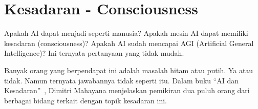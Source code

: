 \chapter{Kesadaran - Consciousness}
Apakah AI dapat menjadi seperti manusia?
Apakah mesin AI dapat memiliki kesadaran (consciousness)?
Apakah AI sudah mencapai AGI (Artificial General Intelligence)?
Ini ternyata pertanyaan yang tidak mudah.

Banyak orang yang berpendapat ini adalah masalah hitam atau putih.
Ya atau tidak.
Namun ternyata jawabannya tidak seperti itu.
Dalam buku ``AI dan Kesadaran''~\cite{dimitrikesadaran}, 
Dimitri Mahayana menjelaskan pemikiran dua puluh orang dari berbagai
bidang terkait dengan topik kesadaran ini.
